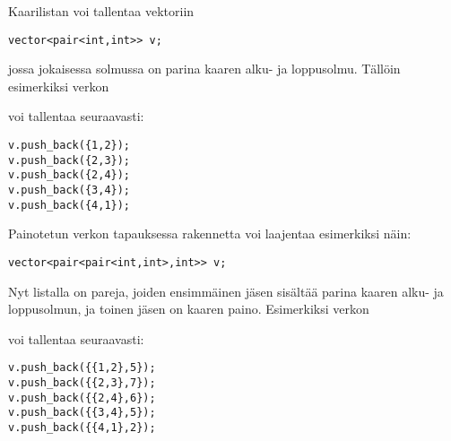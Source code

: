 Kaarilistan voi tallentaa vektoriin
\begin{lstlisting}
vector<pair<int,int>> v;
\end{lstlisting}
jossa jokaisessa solmussa on parina kaaren
alku- ja loppusolmu.
Tällöin esimerkiksi verkon

\begin{center}
\end{center}
voi tallentaa seuraavasti:
\begin{lstlisting}
v.push_back({1,2});
v.push_back({2,3});
v.push_back({2,4});
v.push_back({3,4});
v.push_back({4,1});
\end{lstlisting}

\noindent
Painotetun verkon tapauksessa rakennetta voi laajentaa
esimerkiksi näin:
\begin{lstlisting}
vector<pair<pair<int,int>,int>> v;
\end{lstlisting}
Nyt listalla on pareja, joiden ensimmäinen jäsen
sisältää parina kaaren alku- ja loppusolmun,
ja toinen jäsen on kaaren paino.
Esimerkiksi verkon

\begin{center}
\end{center}
\begin{samepage}
voi tallentaa seuraavasti:
\begin{lstlisting}
v.push_back({{1,2},5});
v.push_back({{2,3},7});
v.push_back({{2,4},6});
v.push_back({{3,4},5});
v.push_back({{4,1},2});
\end{lstlisting}
\end{samepage}